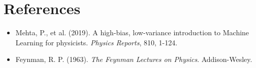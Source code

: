 \section{References}
\begin{itemize}
    \item Mehta, P., et al. (2019). A high-bias, low-variance introduction to Machine Learning for physicists. \textit{Physics Reports}, 810, 1-124.
    \item Feynman, R. P. (1963). \textit{The Feynman Lectures on Physics}. Addison-Wesley.
\end{itemize}
